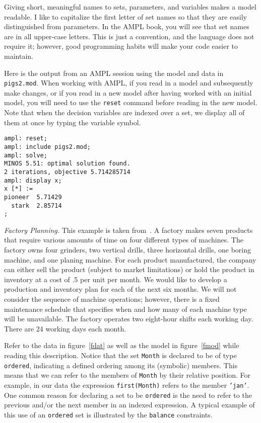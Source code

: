 Giving short, meaningful names to sets, parameters, and variables
makes a model readable.  I like to capitalize the first letter of set
names so that they are easily distinguished from parameters.  In the
AMPL book, you will see that set names are in all upper-case
letters. This is just a convention, and the language does not require
it; however, good programming habits will make your code easier to
maintain.

Here is the output from an AMPL session using the model and data in
\texttt{pigs2.mod}.  When working with AMPL, if you read in a model
and subsequently make changes, or if you read in a new model after
having worked with an initial model, you will need to use the
\texttt{reset} command before reading in the new model. Note that when
the decision variables are indexed over a set, we display all of them
at once by typing the variable symbol.
\begin{Verbatim}[samepage=true]
ampl: reset;
ampl: include pigs2.mod;
ampl: solve;
MINOS 5.51: optimal solution found.
2 iterations, objective 5.714285714
ampl: display x;
x [*] :=
pioneer  5.71429
  stark  2.85714
;
\end{Verbatim}

\emph{Factory Planning.}
This example is taken from~\cite{williams:1999}. 
A factory makes seven products that require various amounts of time on four different
types of machines. The factory owns four grinders, two vertical drills, three 
horizontal drills, one boring machine, and one planing machine. 
For each product manufactured, the company can either sell the
product (subject to market limitations) or hold the product in inventory at a cost of
.5 per unit per month. We would like to develop a production and inventory plan for
each of the next six months.
We will not consider the sequence of machine operations; however, there
is a fixed maintenance schedule that specifies when and how many of each machine type
will be unavailable. The factory operates two eight-hour shifts each working day.
There are 24 working days each month.

Refer to the data in figure~\ref{fdat} as well as the model in
figure~\ref{fmod} while reading this description.
Notice that the set \texttt{Month} is declared to be of type \texttt{ordered},
indicating a defined ordering among its (symbolic) members.
This means that we can refer to the members of \texttt{Month} by their relative position.
For example, in our data the expression \texttt{first(Month)} refers
to the member \texttt{'jan'}. One common reason for declaring a set to be \texttt{ordered}
is the need to refer to the previous and/or the next member in an indexed expression.
A typical example of this use of an \texttt{ordered} set is illustrated by the 
\texttt{balance} constraints.

